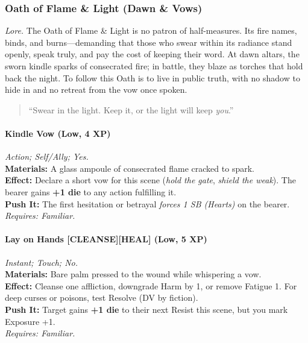 
\subsubsection{Oath of Flame \& Light (Dawn \& Vows)}
\textit{Lore.} The Oath of Flame \& Light is no patron of half-measures. Its fire names, binds, and burns—demanding that those who swear within its radiance stand openly, speak truly, and pay the cost of keeping their word. At dawn altars, the sworn kindle sparks of consecrated fire; in battle, they blaze as torches that hold back the night. To follow this Oath is to live in public truth, with no shadow to hide in and no retreat from the vow once spoken.

\begin{quote}
“Swear in the light. Keep it, or the light will keep \emph{you}.” 
\end{quote}

\paragraph*{Kindle Vow (Low, 4 XP)} \emph{Action; Self/Ally; Yes.}\\
\textbf{Materials:} A glass ampoule of consecrated flame cracked to spark.\\
\textbf{Effect:} Declare a short vow for this scene (\emph{hold the gate}, \emph{shield the weak}). The bearer gains \textbf{+1 die} to any action fulfilling it.\\
\textbf{Push It:} The first hesitation or betrayal \emph{forces 1 SB (Hearts)} on the bearer.\\
\emph{Requires: Familiar.}

\paragraph*{Lay on Hands \textnormal{[CLEANSE][HEAL]} (Low, 5 XP)} \emph{Instant; Touch; No.}\\
\textbf{Materials:} Bare palm pressed to the wound while whispering a vow.\\
\textbf{Effect:} Cleanse one affliction, downgrade Harm by 1, or remove Fatigue 1. For deep curses or poisons, test Resolve (DV by fiction).\\
\textbf{Push It:} Target gains \textbf{+1 die} to their next Resist this scene, but you mark Exposure +1.\\
\emph{Requires: Familiar.}

